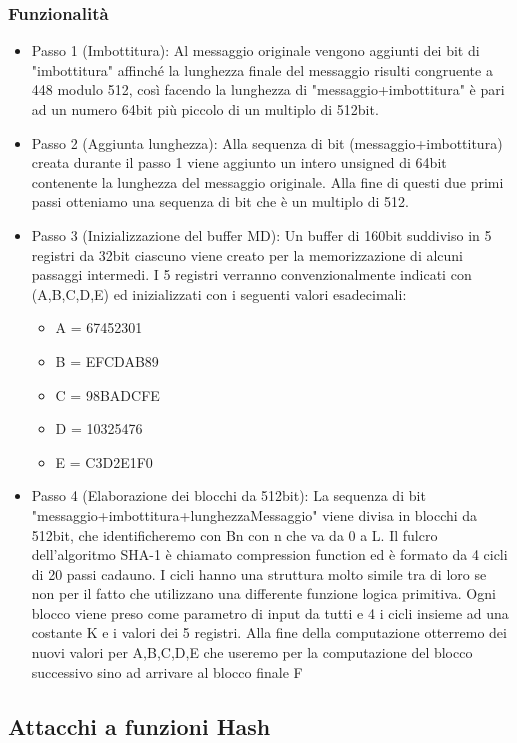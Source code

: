 \documentclass[10pt,a4paper]{article}
\begin{document}
\subsubsection{Funzionalità}
\begin{itemize}
\item Passo 1 (Imbottitura): Al messaggio originale vengono aggiunti dei bit di "imbottitura" affinché la lunghezza finale del messaggio risulti congruente a 448 modulo 512, così facendo la lunghezza di "messaggio+imbottitura" è pari ad un numero 64bit più piccolo di un multiplo di 512bit.
\item Passo 2 (Aggiunta lunghezza): Alla sequenza di bit (messaggio+imbottitura) creata durante il passo 1 viene aggiunto un intero unsigned di 64bit contenente la lunghezza del messaggio originale. Alla fine di questi due primi passi otteniamo una sequenza di bit che è un multiplo di 512.
\item Passo 3 (Inizializzazione del buffer MD): Un buffer di 160bit suddiviso in 5 registri da 32bit ciascuno viene creato per la memorizzazione di alcuni passaggi intermedi. I 5 registri verranno convenzionalmente indicati con (A,B,C,D,E) ed inizializzati con i seguenti valori esadecimali:
\begin{itemize}
\item A = 67452301
\item B = EFCDAB89
\item C = 98BADCFE
\item D = 10325476
\item E = C3D2E1F0
\end{itemize}
\item Passo 4 (Elaborazione dei blocchi da 512bit): La sequenza di bit "messaggio+imbottitura+lunghezzaMessaggio" viene divisa in blocchi da 512bit, che identificheremo con Bn con n che va da 0 a L. Il fulcro dell'algoritmo SHA-1 è chiamato compression function ed è formato da 4 cicli di 20 passi cadauno. I cicli hanno una struttura molto simile tra di loro se non per il fatto che utilizzano una differente funzione logica primitiva. Ogni blocco viene preso come parametro di input da tutti e 4 i cicli insieme ad una costante K e i valori dei 5 registri. Alla fine della computazione otterremo dei nuovi valori per A,B,C,D,E che useremo per la computazione del blocco successivo sino ad arrivare al blocco finale F
\end{itemize}

\subsection{Attacchi a funzioni Hash}
\end{document}
